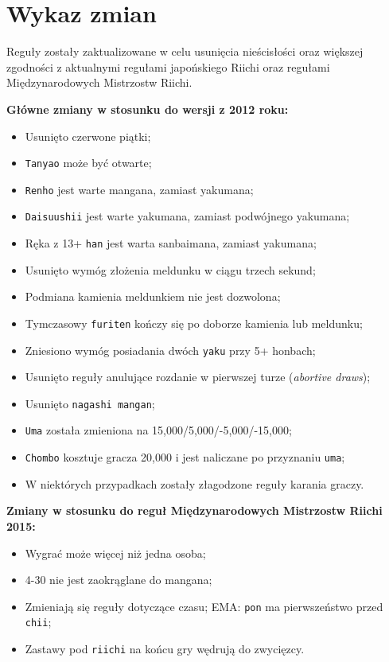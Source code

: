 \section*{Wykaz zmian}

Reguły zostały zaktualizowane w celu usunięcia nieścisłości oraz większej zgodności z aktualnymi regułami japońskiego Riichi oraz regułami Międzynarodowych Mistrzostw Riichi.

\textbf{Główne zmiany w stosunku do wersji z 2012 roku:}
\begin{itemize}
    \item Usunięto czerwone piątki;
    \item \texttt{Tanyao} może być otwarte;
    \item \texttt{Renho} jest warte mangana, zamiast yakumana;
    \item \texttt{Daisuushii} jest warte yakumana, zamiast podwójnego yakumana;
    \item Ręka z 13+ \texttt{han} jest warta sanbaimana, zamiast yakumana;
    \item Usunięto wymóg złożenia meldunku w ciągu trzech sekund;
    \item Podmiana kamienia meldunkiem nie jest dozwolona;
    \item Tymczasowy \texttt{furiten} kończy się po doborze kamienia lub meldunku;
    \item Zniesiono wymóg posiadania dwóch \texttt{yaku} przy 5+ honbach;
    \item Usunięto reguły anulujące rozdanie w pierwszej turze (\emph{abortive draws});
    \item Usunięto \texttt{nagashi mangan};
    \item \texttt{Uma} została zmieniona na 15,000/5,000/-5,000/-15,000;
    \item \texttt{Chombo} kosztuje gracza 20,000 i jest naliczane po przyznaniu \texttt{uma};
    \item W niektórych przypadkach zostały złagodzone reguły karania graczy.
\end{itemize}

\textbf{Zmiany w stosunku do reguł Międzynarodowych Mistrzostw Riichi 2015:}
\begin{itemize}
    \item Wygrać może więcej niż jedna osoba;
    \item 4-30 nie jest zaokrąglane do mangana;
    \item Zmieniają się reguły dotyczące czasu; EMA: \texttt{pon} ma pierwszeństwo przed \texttt{chii};
    \item Zastawy pod \texttt{riichi} na końcu gry wędrują do zwycięzcy.
\end{itemize}